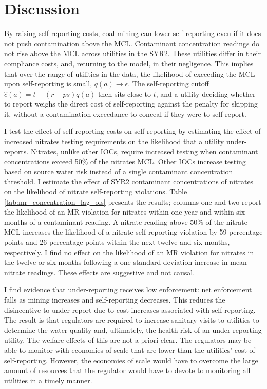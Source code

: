 \documentclass[12pt]{article}
\begin{document}
\section{Discussion}\label{sec:discussion}

By raising self-reporting costs, coal mining can lower self-reporting even if it does not push contamination above the MCL. Contaminant concentration readings do not rise above the MCL across utilities in the SYR2. These utilities differ in their compliance costs, and, returning to the model, in their negligence. This implies that over the range of utilities in the data, the likelihood of exceeding the MCL upon self-reporting is small, $q(a) \rightarrow \epsilon$. The self-reporting cutoff $\hat{c}(a) = t - (r-ps)q(a)$ then sits close to $t$, and a utility deciding whether to report weighs the direct cost of self-reporting against the penalty for skipping it, without a contamination exceedance to conceal if they were to self-report.
 
I test the effect of self-reporting costs on self-reporting by estimating the effect of increased nitrates testing requirements on the likelihood that a utility under-reports. Nitrates, unlike other IOCs, require increased testing when contaminant concentrations exceed 50\% of the nitrates MCL. Other IOCs increase testing based on source water risk instead of a single contaminant concentration threshold. I estimate the effect of SYR2 contaminant concentrations of nitrates on the likelihood of nitrate self-reporting violations. Table \ref{tab:mr_concentration_lag_ols} presents the results; columns one and two report the likelihood of an MR violation for nitrates within one year and within six months of a contaminant reading. A nitrate reading above 50\% of the nitrate MCL increases the likelihood of a nitrate self-reporting violation by 59 percentage points and 26 percentage points within the next twelve and six months, respectively. I find no effect on the likelihood of an MR violation for nitrates in the twelve or six months following a one standard deviation increase in mean nitrate readings. These effects are suggestive and not causal.

I find evidence that under-reporting receives low enforcement: net enforcement falls as mining increases and self-reporting decreases. This reduces the disincentive to under-report due to cost increases associated with self-reporting. The result is that regulators are required to increase sanitary visits to utilities to determine the water quality and, ultimately, the health risk of an under-reporting utility. The welfare effects of this are not a priori clear. The regulators may be able to monitor with economies of scale that are lower than the utilities' cost of self-reporting. However, the economies of scale would have to overcome the large amount of resources that the regulator would have to devote to monitoring all utilities in a timely manner.
\end{document}
